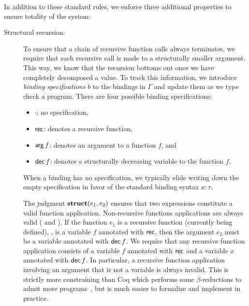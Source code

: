 In addition to these standard rules, we enforce three additional properties to ensure totality of the system:
\begin{description}
  \item[Structural recursion:]
    To ensure that a chain of recursive function calls always terminates, we require that each recursive call is made to a structurally smaller argument.
    This way, we know that the recursion bottoms out once we have completely decomposed a value.
    To track this information, we introduce \emph{binding specifications} $b$ to the bindings in $Γ$ and update them as we type check a program.
    There are four possible binding specifications:
    \begin{itemize}
      \item $·$: no specification,
      \item $\mathsf{rec}$: denotes a recursive function,
      \item $\mathsf{arg}\,f$: denotes an argument to a function $f$, and
      \item $\mathsf{dec}\,f$: denotes a structurally decreasing variable to the function $f$.
    \end{itemize}
    When a binding has no specification, we typically elide writing down the empty specification in favor of the standard binding syntax $x{:}τ$.

    The judgment $\mathbf{struct}(e_1, e_2)$ ensures that two expressions constitute a valid function application.
    Non-recursive functions applications are always valid ( and ).
    If the function $e_1$ is a recursive function (currently being defined), \ie, is a variable $f$ annotated with $\mathsf{rec}$, then the argument $e_2$ must be a variable annotated with $\mathsf{dec}\,f$.
    We require that any recursive function application consists of a variable $f$ annotated with $\mathsf{rec}$ and a variable $x$ annotated with $\mathsf{dec}\,f$.
    In particular, a recursive function application involving an argument that is not a variable is always invalid.
    This is strictly more constraining than Coq which performs some $β$-reductions to admit more programs~\citep{coq-2012}, but is much easier to formalize and implement in practice.


\end{description}
